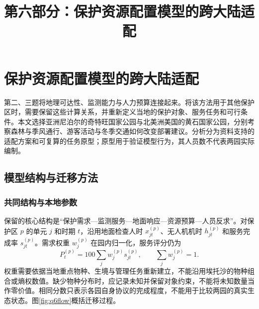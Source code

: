 \documentclass[UTF8,fontset=fandol,12pt,a4paper]{ctexart}
\title{第六部分：保护资源配置模型的跨大陆适配}
\author{}
\date{}
\begin{document}
\maketitle
\vspace{-1.5em}
\section{保护资源配置模型的跨大陆适配}

第二、三题将地理可达性、监测能力与人力预算连接起来。将该方法用于其他保护区时，需要保留这些计算关系，并重新定义当地的保护对象、服务任务和可行条件。本文选择亚洲尼泊尔的奇特旺国家公园与北美洲美国的黄石国家公园，分别考察森林与季风通行、游客活动与冬季交通如何改变部署建议。分析分为资料支持的适配方案和可复算的任务原型；原型用于验证模型行为，其人员数不代表两园实际编制。

\subsection{模型结构与迁移方法}

\subsubsection{共同结构与本地参数}

保留的核心结构是“保护需求—监测服务—地面响应—资源预算—人员反求”。对保护区 \(p\) 的单元 \(j\) 和时期 \(t\)，沿用地面检查人时 \(x_{jt}^{(p)}\)、无人机机时 \(h_{jt}^{(p)}\) 和服务完成率 \(s_{jt}^{(p)}\)。需求权重 \(w_j^{(p)}\) 在园内归一化，服务评分仍为
\begin{equation}
P_t^{(p)}=100\sum_jw_j^{(p)}s_{jt}^{(p)},\qquad
\sum_jw_j^{(p)}=1.
\label{eq:q6score}
\end{equation}
权重需要依据当地重点物种、生境与管理任务重新建立，不能沿用埃托沙的物种组合或熵权数值。缺少物种分布时，应记录未知并保留对象约束，不能将未知数量当作零价值。相同分数只表示各园自身协议的完成程度，不能用于比较两园的真实生态状态。图\ref{fig:q6flow}概括迁移过程。
\end{document}
